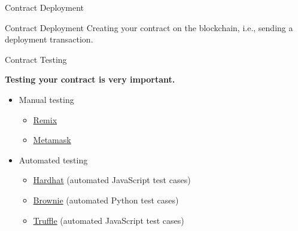 \documentclass[]{beamer}
\begin{document}
\begin{frame}{Contract Deployment}
		
	\begin{keytakeaway}{Contract Deployment}
		Creating your contract on the blockchain, i.e., sending a deployment transaction.
	\end{keytakeaway}
	
	\vspace{1.5em}
\end{frame}



\begin{frame}{Contract Testing}
		
	\textbf{Testing your contract is very important.}\\
	
	\begin{itemize}
		\item<2-> Manual testing
		\begin{itemize}
			\item<2-> \href{https://remix.ethereum.org/}{\link Remix}
			\item<2-> \href{https://metamask.io}{\link Metamask}
		\end{itemize}
		\item<3-> Automated testing
		\begin{itemize}
			\item<3-> \href{https://hardhat.org/}{\link Hardhat} (automated JavaScript test cases)
			\item<3-> \href{https://github.com/eth-brownie/brownie}{\link Brownie} (automated Python test cases)
			\item<3-> \href{https://www.trufflesuite.com/truffle}{\link Truffle} (automated JavaScript test cases)
		\end{itemize}
	\end{itemize}
\end{frame}

%	
%	
\end{document}
